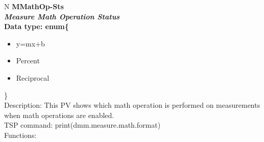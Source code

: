 \documentclass[openany]{article}
\begin{document}
		\begin{tabular}{N}
			\hline
			\bfseries MMathOp-Sts\label{pv:mmathop-sts} \\ \hline
			\emph{Measure Math Operation Status} \\
			Data type: enum\{\begin{itemize}[noitemsep]
				\small
				\item[] y=mx+b
				\item[] Percent
				\item[] Reciprocal
			\end{itemize}\} \\
			Description: This PV shows which math operation is performed on measurements when math operations are enabled. \\
			TSP command: print(dmm.measure.math.format) \\
			Functions: \\
			\arrayrulecolor{\FuncTableBorderColor}

		\end{tabular}
\end{document}
